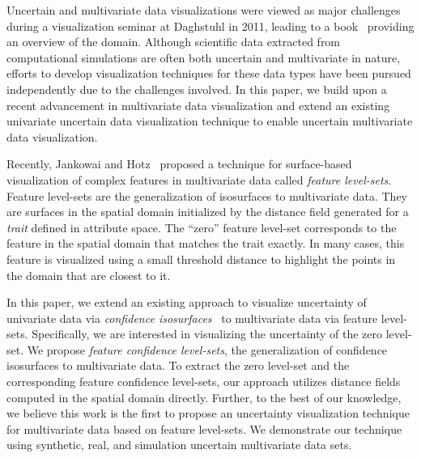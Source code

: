 Uncertain and multivariate data visualizations were viewed as major challenges during a visualization seminar at Daghstuhl in 2011, leading to a book~\cite{hansen2014scientific} providing an overview of the domain. 
%
Although scientific data extracted from computational simulations are often both uncertain and multivariate in nature, efforts to develop visualization techniques for these data types have been pursued independently due to the challenges involved.
%
In this paper, we build upon a recent advancement in multivariate data visualization and extend an existing univariate uncertain data visualization technique to enable uncertain multivariate data visualization.

Recently, Jankowai and Hotz~\cite{jankowai2020feature} proposed a technique for surface-based visualization of complex features in multivariate data called \textit{feature level-sets}. 
%
Feature level-sets are the generalization of isosurfaces to multivariate data.
%
They are surfaces in the spatial domain initialized by the distance field generated for a \textit{trait} defined in attribute space.
%
The ``zero'' feature level-set corresponds to the feature in the spatial domain that matches the trait exactly.
%
In many cases, this feature is visualized using a small threshold distance to highlight the points in the domain that are closest to it. 
%
%

In this paper, we extend an existing approach to visualize uncertainty of univariate data via \textit{confidence isosurfaces}~\cite{zehner2010visualization} to multivariate data via feature level-sets.
%
Specifically, we are interested in visualizing the uncertainty of the zero level-set.
%
We propose \textit{feature confidence level-sets}, the generalization of confidence isosurfaces to multivariate data.
%
%
%
To extract the zero level-set and the corresponding feature confidence level-sets, our approach utilizes distance fields computed in the spatial domain directly.
%
%
Further, to the best of our knowledge, we believe this work is the first to propose an uncertainty visualization technique for multivariate data based on feature level-sets. 
%
We demonstrate our technique using synthetic, real, and simulation uncertain multivariate data sets.

